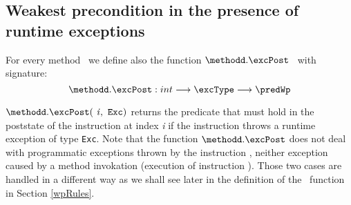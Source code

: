 

\subsection{Weakest precondition in the presence of runtime exceptions}\label{wp:interExc} 

For every method \methodd \  we define also the function $ \methodd.\excPost $ \ with signature:
$$\methodd.\excPost : int   \longrightarrow \excType \longrightarrow  \predWp  $$
 
$ \methodd.\excPost(\mbox{ \rm \textit{i}},  \mbox{ \rm \texttt{Exc}})$ 
returns the predicate that must hold in the poststate of the instruction at index \textit{i} if the
 instruction throws a runtime exception of type \texttt{Exc}.
Note that the function $\methodd.\excPost$  does not deal with programmatic exceptions thrown by the instruction \athrow,
 neither exception caused by a method invokation
(execution of instruction \invoke). Those two cases are handled in a different way as we
 shall see later in the definition of the \fwpi \ function in Section
\ref{wpRules}.  

